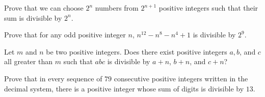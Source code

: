 \documentclass{subfile}
\begin{document}
	\begin{problem}
		Prove that we can choose $2^n$ numbers from $2^{n+1}$ positive integers such that their sum is divisible by $2^n$. %
	\end{problem}

	\begin{problem}
		Prove that for any odd positive integer $n$, $n^{12}-n^8-n^4+1$ is divisible by $2^9$. %
	\end{problem}


	\begin{problem}
		Let $m$ and $n$ be two positive integers. Does there exist positive integers $a,b$, and $c$ all greater than $m$ such that $abc$ is divisible by $a+n$, $b+n$, and $c+n$? %
	\end{problem}

%
%
%

	\begin{problem}
		Prove that in every sequence of $79$ consecutive positive integers written in the decimal system, there is a positive integer whose sum of digits is divisible by $13$. %
	\end{problem}
\end{document}
